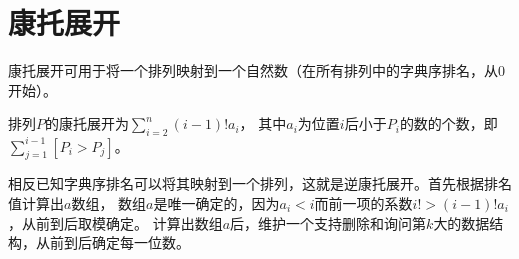 \section{康托展开}
康托展开可用于将一个排列映射到一个自然数（在所有排列中的字典序排名，从0开始）。

排列$P$的康托展开为$\displaystyle \sum_{i=2}^n{(i-1)!a_i}$，
其中$a_i$为位置$i$后小于$P_i$的数的个数，即$\displaystyle \sum_{j=1}^{i-1}[P_i>P_j]$。

相反已知字典序排名可以将其映射到一个排列，这就是逆康托展开。首先根据排名值计算出$a$数组，
数组$a$是唯一确定的，因为$a_i<i$而前一项的系数$i!> (i-1)!a_i$，从前到后取模确定。
计算出数组$a$后，维护一个支持删除和询问第$k$大的数据结构，从前到后确定每一位数。
